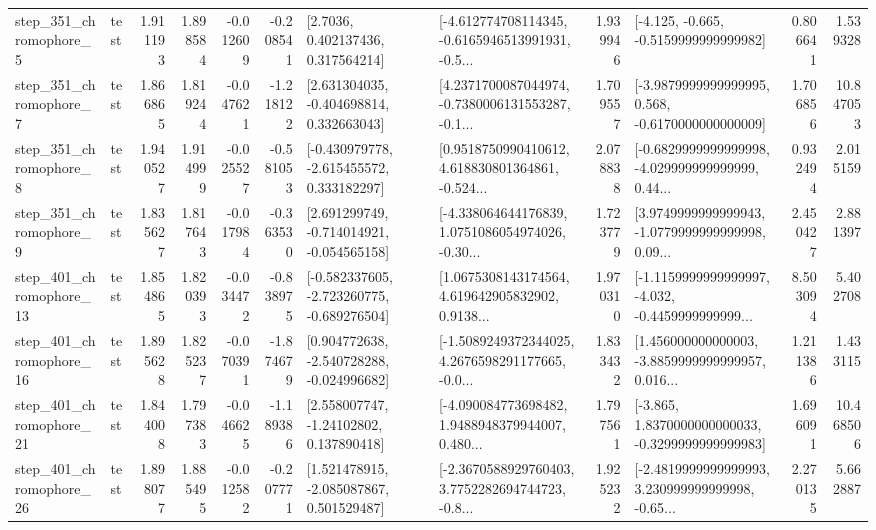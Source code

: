\begin{tabular}{llrrrrllrlrr}
   step\_351\_chromophore\_5 &      test &      1.911193 &    1.898584 &     -0.012609 & -0.208541 &          [2.7036, 0.402137436, 0.317564214] &  [-4.612774708114345, -0.6165946513991931, -0.5... &       1.939946 &              [-4.125, -0.665, -0.5159999999999982] &            0.806641 &          1.539328 \\
   step\_351\_chromophore\_7 &      test &      1.866865 &    1.819244 &     -0.047621 & -1.218122 &    [2.631304035, -0.404698814, 0.332663043] &  [4.2371700087044974, -0.7380006131553287, -0.1... &       1.709557 &  [-3.9879999999999995, 0.568, -0.6170000000000009] &            1.706856 &         10.847053 \\
   step\_351\_chromophore\_8 &      test &      1.940527 &    1.914999 &     -0.025527 & -0.581053 &   [-0.430979778, -2.615455572, 0.333182297] &  [0.9518750990410612, 4.618830801364861, -0.524... &       2.078838 &  [-0.6829999999999998, -4.029999999999999, 0.44... &            0.932494 &          2.015159 \\
   step\_351\_chromophore\_9 &      test &      1.835627 &    1.817643 &     -0.017984 & -0.363530 &   [2.691299749, -0.714014921, -0.054565158] &  [-4.338064644176839, 1.0751086054974026, -0.30... &       1.723779 &  [3.9749999999999943, -1.0779999999999998, 0.09... &            2.450427 &          2.881397 \\
  step\_401\_chromophore\_13 &      test &      1.854865 &    1.820393 &     -0.034472 & -0.838975 &  [-0.582337605, -2.723260775, -0.689276504] &  [1.0675308143174564, 4.619642905832902, 0.9138... &       1.970310 &  [-1.1159999999999997, -4.032, -0.4459999999999... &            8.503094 &          5.402708 \\
  step\_401\_chromophore\_16 &      test &      1.895628 &    1.825237 &     -0.070391 & -1.874679 &   [0.904772638, -2.540728288, -0.024996682] &  [-1.5089249372344025, 4.2676598291177665, -0.0... &       1.833432 &  [1.456000000000003, -3.8859999999999957, 0.016... &            1.211386 &          1.433115 \\
  step\_401\_chromophore\_21 &      test &      1.844008 &    1.797383 &     -0.046625 & -1.189386 &     [2.558007747, -1.24102802, 0.137890418] &  [-4.090084773698482, 1.9488948379944007, 0.480... &       1.797561 &  [-3.865, 1.8370000000000033, -0.3299999999999983] &            1.696091 &         10.468506 \\
  step\_401\_chromophore\_26 &      test &      1.898077 &    1.885495 &     -0.012582 & -0.207771 &    [1.521478915, -2.085087867, 0.501529487] &  [-2.3670588929760403, 3.7752282694744723, -0.8... &       1.925232 &  [-2.4819999999999993, 3.230999999999998, -0.65... &            2.270135 &          5.662887 \\

\end{tabular}
